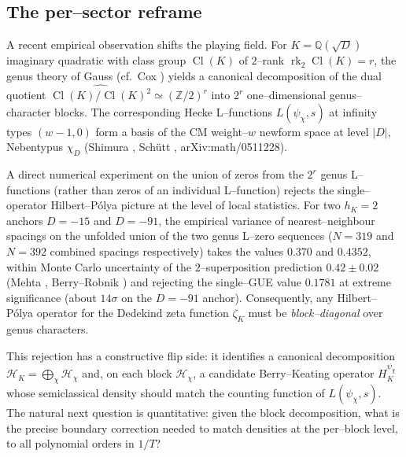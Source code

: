 \documentclass[11pt]{amsart}
\theoremstyle{definition}
\theoremstyle{remark}
\DeclareMathOperator{\Cl}{Cl}
\DeclareMathOperator{\rk}{rk}
\newcommand{\Q}{\mathbb{Q}}
\newcommand{\Z}{\mathbb{Z}}
\begin{document}
\subsection{The per--sector reframe}\label{ssec:per-sector}
A recent empirical observation
shifts the playing field. For
\(K = \Q(\sqrt{D})\) imaginary quadratic with class group
\(\Cl(K)\) of \(2\)--rank \(\rk_2 \Cl(K) = r\), the genus theory of
Gauss \cite{Gauss1801} (cf.\ Cox \cite[Thm.~3.15]{Cox1989}) yields a
canonical decomposition of the dual quotient
\(\widehat{\Cl(K)/\Cl(K)^2} \simeq (\Z/2)^r\)
into \(2^r\) one--dimensional genus--character blocks. The corresponding
Hecke L--functions \(L(\psi_\chi, s)\) at infinity types
\((w{-}1, 0)\) form a basis of the CM weight--\(w\) newform space at
level \(|D|\), Nebentypus \(\chi_D\) (Shimura
\cite{Shimura1971}, Schütt \cite{Schutt2008}, arXiv:math/0511228).

A direct numerical experiment on the union of zeros from the \(2^r\)
genus L--functions (rather than zeros of an individual L--function)
rejects the single--operator Hilbert--P\'olya picture at the level of
local statistics. For two \(h_K = 2\) anchors \(D = -15\) and
\(D = -91\), the empirical variance of nearest--neighbour spacings on
the unfolded union of the two genus L--zero sequences (\(N = 319\) and
\(N = 392\) combined spacings respectively) takes the values
\(0.370\) and \(0.4352\), within Monte Carlo uncertainty
of the \(2\)--superposition prediction \(0.42 \pm 0.02\) (Mehta
\cite[Ch.~22]{Mehta2004}, Berry--Robnik
\cite{BerryRobnik1984}) and rejecting the single--GUE value
\(0.1781\) at extreme significance (about \(14\sigma\) on the
\(D = -91\) anchor). Consequently, any Hilbert--P\'olya operator for
the Dedekind zeta function \(\zeta_K\) must be \emph{block--diagonal}
over genus characters.

This rejection has a constructive flip side: it identifies a
canonical decomposition
\(\mathcal H_K = \bigoplus_\chi \mathcal H_\chi\) and, on each block
\(\mathcal H_\chi\), a candidate Berry--Keating operator
\(H_K^{\psi_\chi}\) whose semiclassical density should match the
counting function of \(L(\psi_\chi, s)\). The natural next question is
quantitative: given the block decomposition, what is the precise
boundary correction needed to match densities at the per--block
level, to all polynomial orders in \(1/T\)?
\end{document}
